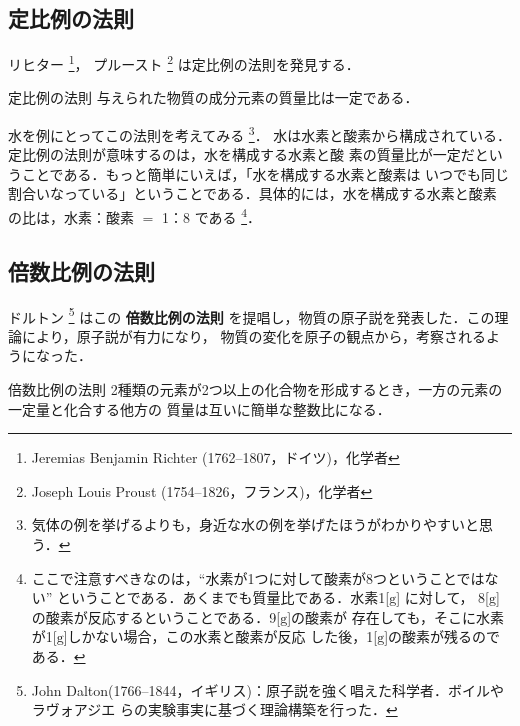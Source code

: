         \subsection{定比例の法則}
            リヒター
                \footnote{
                    Jeremias Benjamin Richter (1762--1807，ドイツ)，化学者
                }，
            プルースト
                \footnote{
                    Joseph Louis Proust (1754--1826，フランス)，化学者
                }
            は定比例の法則を発見する．

                \begin{myshadebox}{定比例の法則}
                    与えられた物質の成分元素の質量比は一定である．
                \end{myshadebox}

            水を例にとってこの法則を考えてみる
                \footnote{
                    気体の例を挙げるよりも，身近な水の例を挙げたほうがわかりやすいと思う．
                }．
            水は水素と酸素から構成されている．定比例の法則が意味するのは，水を構成する水素と酸
            素の質量比が一定だということである．もっと簡単にいえば，「水を構成する水素と酸素は
            いつでも同じ割合いなっている」ということである．具体的には，水を構成する水素と酸素
            の比は，水素：酸素 $=$ 1：8 である
                \footnote{
                    ここで注意すべきなのは，“水素が1つに対して酸素が8つということではない”
                     ということである．あくまでも質量比である．水素1[$\mathrm{g}$] に対して，
                     8[$\mathrm{g}$] の酸素が反応するということである．9[$\mathrm{g}$]の酸素が
                     存在しても，そこに水素が1[$\mathrm{g}$]しかない場合，この水素と酸素が反応
                     した後，1[$\mathrm{g}$]の酸素が残るのである．
                }．

        \subsection{倍数比例の法則}
            ドルトン
                \footnote{
                    John Dalton(1766--1844，イギリス)：原子説を強く唱えた科学者．ボイルやラヴォアジエ
                    らの実験事実に基づく理論構築を行った．
                }
            はこの \textbf{倍数比例の法則} を提唱し，物質の原子説を発表した．この理論により，原子説が有力になり，
            物質の変化を原子の観点から，考察されるようになった．
                \begin{myshadebox}{倍数比例の法則}
                    2種類の元素が2つ以上の化合物を形成するとき，一方の元素の一定量と化合する他方の
                    質量は互いに簡単な整数比になる．
                \end{myshadebox}

